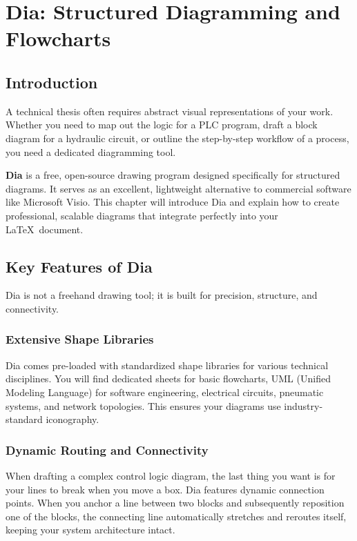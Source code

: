 \chapter{Dia: Structured Diagramming and Flowcharts}\label{ch:dia}
	\section{Introduction}\label{sec:DiaIntroduction}
		A technical thesis often requires abstract visual representations of your work. 
		Whether you need to map out the logic for a PLC program, draft a block diagram for a hydraulic circuit, or outline the step-by-step workflow of a process, you need a dedicated diagramming tool.

		\textbf{Dia} is a free, open-source drawing program designed specifically for structured diagrams. 
		It serves as an excellent, lightweight alternative to commercial software like Microsoft Visio. 
		This chapter will introduce Dia and explain how to create professional, scalable diagrams that integrate perfectly into your \LaTeX\ document.

	\section{Key Features of Dia}
		Dia is not a freehand drawing tool; it is built for precision, structure, and connectivity.

		\subsection{Extensive Shape Libraries}
			Dia comes pre-loaded with standardized shape libraries for various technical disciplines. 
			You will find dedicated sheets for basic flowcharts, UML (Unified Modeling Language) for software engineering, electrical circuits, pneumatic systems, and network topologies. 
			This ensures your diagrams use industry-standard iconography.

		\subsection{Dynamic Routing and Connectivity}
			When drafting a complex control logic diagram, the last thing you want is for your lines to break when you move a box. 
			Dia features dynamic connection points. 
			When you anchor a line between two blocks and subsequently reposition one of the blocks, the connecting line automatically stretches and reroutes itself, keeping your system architecture intact.

